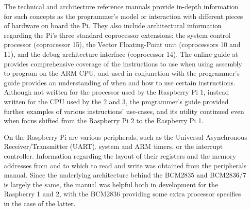         The technical and architecture reference manuals provide in-depth
        information for such concepts as the programmer's model or interaction
        with different pieces of hardware on board the Pi. They also include
        architectural information regarding the Pi's three standard coprocessor
        extensions: the system control processor (coprocessor 15), the Vector
        Floating-Point unit (coprocessors 10 and 11), and the debug architecture
        interface (coprocessor 14).  The online guide at \cite{OnlineARMGuide}
        provides comprehensive coverage of the instructions to use when using
        assembly to program on the ARM CPU, and used in conjunction with the
        programmer's guide provides an understanding of when and how to use
        certain instructions.  Although not written for the processor used by
        the Raspberry Pi 1, instead written for the CPU used by the 2 and 3, the
        programmer's guide provided further examples of various instructions'
        use-cases, and its utility continued even when focus shifted from the
        Raspberry Pi 2 to the Raspberry Pi 1.

        On the Raspberry Pi are various peripherals, such as the Universal
        Asynchronous Receiver/Transmitter (UART), system and ARM timers, or the
        interrupt controller. Information regarding the layout of their
        registers and the memory addresses from and to which to read and write
        was obtained from the peripherals manual. Since the underlying
        architecture behind the BCM2835 and BCM2836/7 is largely the same, the
        manual was helpful both in development for the Raspberry 1 and 2, with
        the BCM2836 \cite{BCM2836} providing some extra processor specifics in
        the case of the latter.

